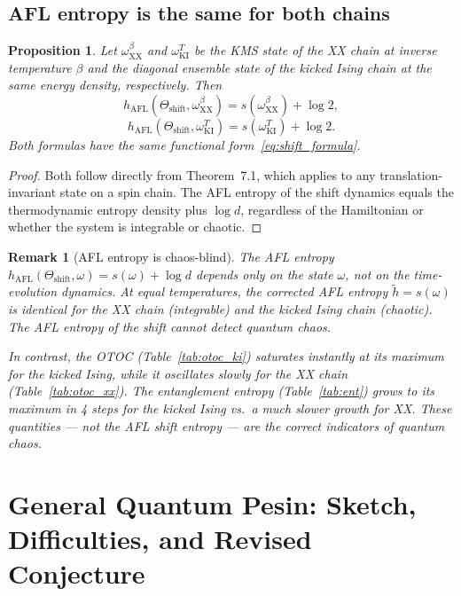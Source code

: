 \documentclass[12pt,a4paper]{article}
\newtheorem{proposition}[theorem]{Proposition}
\newtheorem{remark}[theorem]{Remark}
\begin{document}
\subsection{AFL entropy is the same for both chains}

\begin{proposition}
  Let $\omega_{\mathrm{XX}}^\beta$ and $\omega_{\mathrm{KI}}^T$ be the KMS state of the
  XX chain at inverse temperature $\beta$ and the diagonal ensemble state of the kicked
  Ising chain at the same energy density, respectively.  Then
  \[
    h_{\mathrm{AFL}}(\Theta_{\mathrm{shift}}, \omega_{\mathrm{XX}}^\beta)
    = s(\omega_{\mathrm{XX}}^\beta) + \log 2,
  \]
  \[
    h_{\mathrm{AFL}}(\Theta_{\mathrm{shift}}, \omega_{\mathrm{KI}}^T)
    = s(\omega_{\mathrm{KI}}^T) + \log 2.
  \]
  Both formulas have the same functional form~\eqref{eq:shift_formula}.
\end{proposition}
\begin{proof}
  Both follow directly from Theorem~7.1, which applies to any translation-invariant
  state on a spin chain.  The AFL entropy of the shift dynamics equals the
  thermodynamic entropy density plus $\log d$, regardless of the Hamiltonian or
  whether the system is integrable or chaotic.
\end{proof}

\begin{remark}[AFL entropy is chaos-blind]
  \label{rem:chaos_blind}
  The AFL entropy $h_{\mathrm{AFL}}(\Theta_{\mathrm{shift}}, \omega) = s(\omega) + \log d$
  depends only on the \emph{state} $\omega$, not on the time-evolution dynamics.
  At equal temperatures, the corrected AFL entropy
  $\widetilde{h} = s(\omega)$ is identical for the XX chain (integrable) and the kicked
  Ising chain (chaotic).  The AFL entropy of the \emph{shift} cannot detect quantum chaos.

  In contrast, the OTOC (Table~\ref{tab:otoc_ki}) saturates instantly at its maximum
  for the kicked Ising, while it oscillates slowly for the XX chain (Table~\ref{tab:otoc_xx}).
  The entanglement entropy (Table~\ref{tab:ent}) grows to its maximum in 4 steps for
  the kicked Ising vs.\ a much slower growth for XX.
  These quantities --- not the AFL shift entropy --- are the correct indicators of
  quantum chaos.
\end{remark}

\section{General Quantum Pesin: Sketch, Difficulties, and Revised Conjecture}
\label{sec:qp_general}
\end{document}
